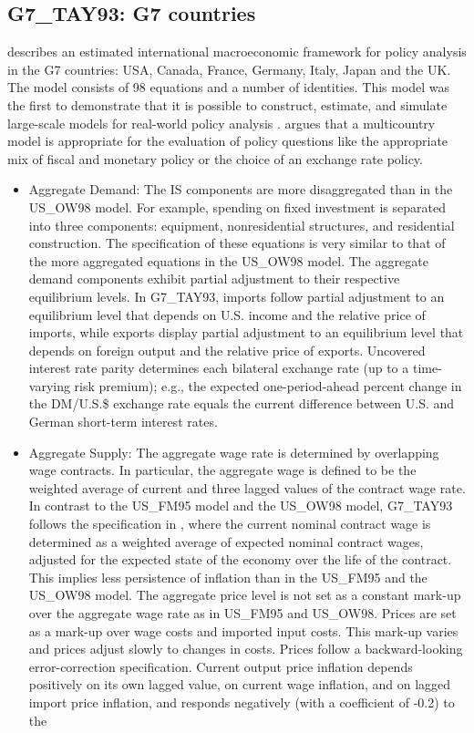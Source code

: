 \documentclass[11pt,a4paper]{article}
\begin{document}
	\subsection{G7\_TAY93: \cite{Taylor1993a} G7 countries}
	\label{G7TAY93}
	\cite{Taylor1993a} describes an estimated international macroeconomic framework for policy analysis in the G7 countries: USA, Canada, France, Germany, Italy, Japan and the UK. The model consists of 98 equations and a number of identities.
	This model was the first to demonstrate that it is possible to construct, estimate, and simulate large-scale models for real-world policy analysis \citep{Yellen2007}. \cite{Taylor1993a} argues that a multicountry model is appropriate for the evaluation of policy questions like the appropriate mix of fiscal and monetary policy or the choice of an exchange rate policy.
	\begin{itemize}
		\item Aggregate Demand: The IS components are more disaggregated than in the US\_OW98 model. For example, spending on fixed investment is separated into three components: equipment, nonresidential structures, and residential construction. %
		The specification of these equations is very similar to that of the more aggregated equations in the US\_OW98 model. The aggregate demand components exhibit partial adjustment to their respective equilibrium levels. In G7\_TAY93, imports follow partial adjustment to an equilibrium level that depends on U.S. income and the relative price of imports, while exports display partial adjustment to an equilibrium level that depends on foreign output and the relative price of exports. Uncovered interest rate parity determines each bilateral exchange rate (up to a time-varying risk premium); e.g., the expected one-period-ahead percent change in the DM/U.S.\$ exchange rate equals the current difference between U.S. and German short-term interest rates.
		\item Aggregate Supply: The aggregate wage rate is determined by overlapping wage contracts. In particular, the aggregate wage is defined to be the weighted average of current and three lagged values of the contract wage rate. In contrast to the US\_FM95 model and the US\_OW98 model, G7\_TAY93 follows the specification in \cite{Taylor1980}, where the current nominal contract wage is determined as a weighted average of expected nominal contract wages, adjusted for the expected state of the economy over the life of the contract. This implies less persistence of inflation than in the US\_FM95 and the US\_OW98 model. The aggregate price level is not set as a constant mark-up over the aggregate wage rate as in US\_FM95 and US\_OW98. Prices are set as a mark-up over wage costs and imported input costs. This mark-up varies and prices adjust slowly to changes in costs. Prices follow a backward-looking error-correction specification. Current output price inflation depends positively on its own lagged value, on current wage inflation, and on lagged import price inflation, and responds negatively (with a coefficient of -0.2) to the

\end{itemize}
\end{document}
